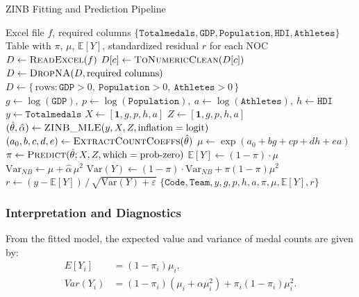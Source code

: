 \documentclass[11pt,twoside]{article}
\numberwithin{Theorem}{section}
\numberwithin{Definition}{section}
\numberwithin{Lemma}{section}
\numberwithin{Algorithm}{section}
\numberwithin{equation}{section}
\begin{document}
\begin{algorithm}[t]
\caption{ZINB Fitting and Prediction Pipeline}
\label{alg:zinb}
\begin{algorithmic}[1]
\Require Excel file $f$, required columns $\{\texttt{Totalmedals},\texttt{GDP},\texttt{Population},\texttt{HDI},\texttt{Athletes}\}$
\Ensure Table with $\pi$, $\mu$, $\mathbb{E}[Y]$, standardized residual $r$ for each NOC
  \State $D \gets \Call{ReadExcel}{f}$
   
     \State $D[c] \gets \Call{ToNumericClean}{D[c]}$
  \EndFor
  \State $D \gets \Call{DropNA}{D, \text{required columns}}$
  \State $D \gets \{\,\text{rows}: \texttt{GDP}>0,\ \texttt{Population}>0,\ \texttt{Athletes}>0\,\}$
  \State $g \gets \log(\texttt{GDP}),\ p \gets \log(\texttt{Population}),\ a \gets \log(\texttt{Athletes}),\ h \gets \texttt{HDI}$
  \State $y \gets \texttt{Totalmedals}$
  \State $X \gets [\mathbf{1}, g, p, h, a]$ 
  \State $Z \gets [\mathbf{1}, g, p, h, a]$ 
  \State $(\hat\theta,\hat\alpha) \gets \Call{ZINB\_MLE}{y,X,Z,\text{inflation}=\text{logit}}$ 
  \State $(a_0,b,c,d,e) \gets \Call{ExtractCountCoeffs}{\hat\theta}$
  \State $\mu \gets \exp(a_0 + b g + c p + d h + e a)$
  \State $\pi \gets \Call{Predict}{\hat\theta; X,Z,\text{which}=\text{prob-zero}}$
  \State $\mathbb{E}[Y] \gets (1-\pi)\cdot \mu$
  \State $\mathrm{Var}_{NB} \gets \mu + \hat\alpha\,\mu^2$
  \State $\mathrm{Var}(Y) \gets (1-\pi)\cdot \mathrm{Var}_{NB} + \pi(1-\pi)\mu^2$
  \State $r \gets (y-\mathbb{E}[Y])\,/\,\sqrt{\mathrm{Var}(Y)+\varepsilon}$ 
  \State \Return $\{\texttt{Code},\texttt{Team},y,g,p,h,a,\pi,\mu,\mathbb{E}[Y],r\}$
\EndFunction
\end{algorithmic}
\end{algorithm}


\subsubsection{Interpretation and Diagnostics}
From the fitted model, the expected value and variance of medal counts are given by:
\begin{align}
E[Y_i] &= (1 - \pi_i)\mu_i, \label{eq:expected_value}\\
Var(Y_i) &= (1 - \pi_i)(\mu_i + \alpha \mu_i^2) + \pi_i (1 - \pi_i)\mu_i^2. \label{eq:variance}
\end{align}
\end{document}

